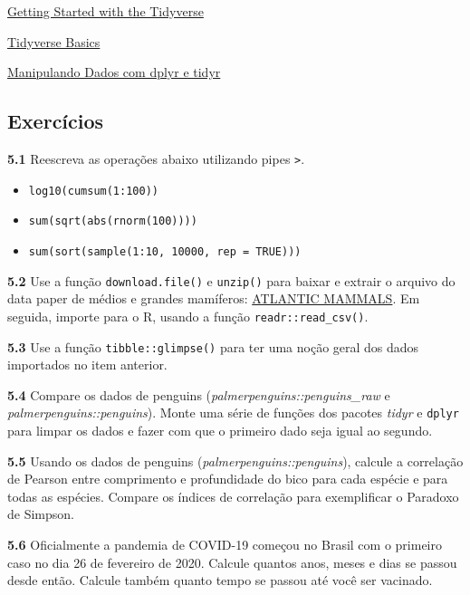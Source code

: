 \documentclass[
]{article}
\providecommand{\tightlist}{%
  \setlength{\itemsep}{0pt}\setlength{\parskip}{0pt}}
\begin{document}
\href{https://www.datacamp.com/community/tutorials/tidyverse-tutorial-r}{Getting Started with the Tidyverse}

\href{https://www.dataquest.io/blog/load-clean-data-r-tidyverse/}{Tidyverse Basics}

\href{https://www.ufrgs.br/wiki-r/index.php?title=Manipulando_Dados_com_dplyr_e_tidyr}{Manipulando Dados com dplyr e tidyr}

\hypertarget{exercuxedcios-1}{%
\subsection{Exercícios}\label{exercuxedcios-1}}

\textbf{5.1}
Reescreva as operações abaixo utilizando pipes \texttt{\textbar{}\textgreater{}}.

\begin{itemize}
\tightlist
\item
  \texttt{log10(cumsum(1:100))}
\item
  \texttt{sum(sqrt(abs(rnorm(100))))}
\item
  \texttt{sum(sort(sample(1:10,\ 10000,\ rep\ =\ TRUE)))}
\end{itemize}

\textbf{5.2}
Use a função \texttt{download.file()} e \texttt{unzip()} para baixar e extrair o arquivo do data paper de médios e grandes mamíferos: \href{https://doi.org/10.1002/ecy.2785}{ATLANTIC MAMMALS}. Em seguida, importe para o R, usando a função \texttt{readr::read\_csv()}.

\textbf{5.3}
Use a função \texttt{tibble::glimpse()} para ter uma noção geral dos dados importados no item anterior.

\textbf{5.4}
Compare os dados de penguins (\emph{palmerpenguins::penguins\_raw} e \emph{palmerpenguins::penguins}). Monte uma série de funções dos pacotes \emph{tidyr} e \texttt{dplyr} para limpar os dados e fazer com que o primeiro dado seja igual ao segundo.

\textbf{5.5}
Usando os dados de penguins (\emph{palmerpenguins::penguins}), calcule a correlação de Pearson entre comprimento e profundidade do bico para cada espécie e para todas as espécies. Compare os índices de correlação para exemplificar o Paradoxo de Simpson.

\textbf{5.6}
Oficialmente a pandemia de COVID-19 começou no Brasil com o primeiro caso no dia 26 de fevereiro de 2020. Calcule quantos anos, meses e dias se passou desde então. Calcule também quanto tempo se passou até você ser vacinado.
\end{document}
